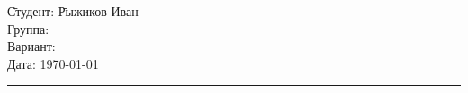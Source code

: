 \begin{tabbing}
	\hspace{11cm} \= Студент: \= Рыжиков Иван  \\	%
	\> Группа:  \\	%
	\> Вариант:  \\		%
	\> Дата: \> \today		%
\end{tabbing}
\hrule
\vspace{1cm}